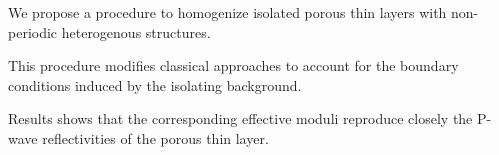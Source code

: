 \documentclass[draft]{agujournal2019}
\begin{document}





\begin{keypoints}
\item We propose a procedure to homogenize isolated porous thin layers with non-periodic heterogenous structures.
\item This procedure modifies classical approaches to account for the boundary conditions induced by the isolating background.
\item Results shows that the corresponding effective moduli reproduce closely the P-wave reflectivities of the porous thin layer.


\end{keypoints}

%
%

%
%
\end{document}
